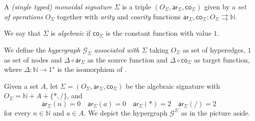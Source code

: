 \documentclass[3p]{elsarticle}
\newcommand{\ari}{\mathsf{ar}}
\newcommand{\coar}{\mathsf{co}}
\theoremstyle{remark}
\theoremstyle{definition}
\begin{document}
\smallskip 
\noindent
\begin{minipage}[l]{.75\linewidth}
	\begin{defi}\label{def:alg}
		A \emph{(single typed) monoidal signature} $\Sigma$ is a triple $(O_\Sigma, \ari_\Sigma, \coar_\Sigma)$ given by a \emph{set of operations} $O_\Sigma$ together with \emph{arity} and \emph{coarity} functions $\ari_\Sigma, \coar_\Sigma\colon O_\Sigma \rightrightarrows \mathbb{N}$.  
		
		We say that $\Sigma$ is \emph{algebraic} if $\coar_{\Sigma}$ is the constant function with value $1$.
		
		We define the \emph{hypergraph $\mathcal{G}_\Sigma$ associated with $\Sigma$} taking $O_\Sigma$ as set of hyperedges, $1$ as set of nodes and $\Delta \circ \ari_\Sigma$ as the source function and $ \Delta \circ  \coar_{\Sigma}$ as target function, where $\Delta \colon \mathbb{N}\to 1^\star$ is the isomorphism of .
	\end{defi}
	
	\begin{exa}\label{exa_3} 
		Given a set $A$, let $\Sigma = (O_\Sigma, \ari_\Sigma, \coar_{\Sigma})$ be the algebraic signature with $O_\Sigma =  \mathbb{N} + A + \{*, /\}$, 
		and 
		\[\ari_\Sigma(n)=0 \quad \ari_\Sigma(a) = 0 \quad \ari_\Sigma(*) =2 \quad  \ari_\Sigma(/) = 2\]
		for every $n\in \mathbb{N}$ and $a\in A$. We depict the hypergraph $\mathcal{G}^\Sigma$  as in the picture aside.
	\end{exa}
	\end{minipage}
	\hfill
\end{document}
